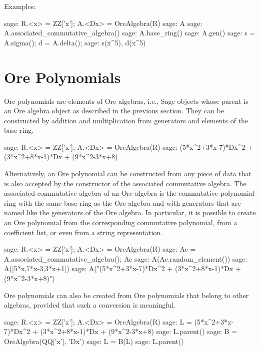 \documentclass{amsart}
\begin{document}
\smallskip

Examples: 

\begin{sageexample}
  sage: R.<x> = ZZ['x']; A.<Dx> = OreAlgebra(R)
  sage: A
  sage: A.associated_commutative_algebra()
  sage: A.base_ring()
  sage: A.gen()
  sage: s = A.sigma(); d = A.delta(); 
  sage: s(x^5), d(x^5)
\end{sageexample}

\section{Ore Polynomials}\label{sec:3}

Ore polynomials are elements of Ore algebras, i.e., Sage objects whose parent is an Ore algebra
object as described in the previous section. They can be constructed by addition and multiplication
from generators and elements of the base ring. 

\begin{sageexample}
  sage: R.<x> = ZZ['x']; A.<Dx> = OreAlgebra(R)
  sage: (5*x^2+3*x-7)*Dx^2 + (3*x^2+8*x-1)*Dx + (9*x^2-3*x+8)
\end{sageexample}

Alternatively, an Ore polynomial can be constructed from any piece of data that is also accepted
by the constructor of the associated commutative algebra. The associated commutative algebra of
an Ore algebra is the commutative polynomial ring with the same base ring as the Ore algebra 
and with generators that are named like the generators of the Ore algebra. In particular, it is
possible to create an Ore polynomial from the corresponding commutative polynomial, from a 
coefficient list, or even from a string representation.

\begin{sageexample}
  sage: R.<x> = ZZ['x']; A.<Dx> = OreAlgebra(R)
  sage: Ac = A.associated_commutative_algebra(); Ac
  sage: A(Ac.random_element())
  sage: A([5*x,7*x-3,3*x+1])
  sage: A("(5*x^2+3*x-7)*Dx^2 + (3*x^2+8*x-1)*Dx + (9*x^2-3*x+8)")
\end{sageexample}

Ore polynomials can also be created from Ore polynomials that belong to other algebras, provided
that such a conversion is meaningful. 

\begin{sageexample}
  sage: R.<x> = ZZ['x']; A.<Dx> = OreAlgebra(R)
  sage: L = (5*x^2+3*x-7)*Dx^2 + (3*x^2+8*x-1)*Dx + (9*x^2-3*x+8)
  sage: L.parent()
  sage: B = OreAlgebra(QQ['x'], 'Dx')
  sage: L = B(L)
  sage: L.parent()
\end{sageexample}
\end{document}
